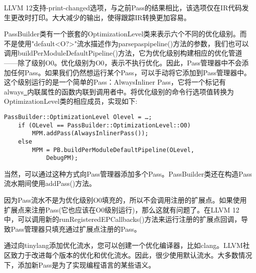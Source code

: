 \begin{enumerate}
\begin{tcolorbox}[colback=blue!5!white,colframe=mymauve!75!black, title=LLVM 12的新打印选项]
LLVM 12支持-print-changed选项，与之前Pass的结果相比，该选项仅在IR代码发生更改时打印。大大减少的输出，使得跟踪IR转换更加容易。
\end{tcolorbox}

PassBuilder类有一个嵌套的OptimizationLevel类来表示六个不同的优化级别。而不是使用"default<O?>"流水描述作为parsepaspipeline()方法的参数，我们也可以调用buildPerModul\allowbreak eDefaultPipeline()方法，它为优化级别构建相应的优化管道——除了级别O0。优化级别为O0，表示不执行优化。因此，Pass管理器中不会添加任何Pass。如果我们仍然想运行某个Pass，可以手动将它添加到Pass管理器中。这个级别运行的是一个简单的Pass：AlwaysInliner Pass，它将一个标记有always\underline{~}内联属性的函数内联到调用者中。将优化级别的命令行选项值转换为OptimizationLevel类的相应成员，实现如下:
\begin{lstlisting}[caption={}]
	PassBuilder::OptimizationLevel Olevel = …;
	if (OLevel == PassBuilder::OptimizationLevel::O0)
		MPM.addPass(AlwaysInlinerPass());
	else
		MPM = PB.buildPerModuleDefaultPipeline(OLevel, 
			DebugPM);
\end{lstlisting}

当然，可以通过这种方式向Pass管理器添加多个Pass。PassBuilder类还在构造Pass流水期间使用addPass()方法。\par

\begin{tcolorbox}[colback=blue!5!white,colframe=mymauve!75!black, title=LLVM 12中的新功能——运行扩展点回调]
因为Pass流水不是为优化级别O0填充的，所以不会调用注册的扩展点。如果使用扩展点来注册Pass(它也应该在O0级别运行)，那么这就有问题了。在LLVM 12中，可以调用新的runRegisteredEPCallbacks()方法来运行注册的扩展点回调，导致Pass管理器只填充通过扩展点注册的Pass。
\end{tcolorbox}

\end{enumerate}

通过向tinylang添加优化流水，您可以创建一个优化编译器，比如clang。LLVM社区致力于改进每个版本的优化和优化流水。因此，很少使用默认流水。大多数情况下，添加新Pass是为了实现编程语言的某些语义。\par




